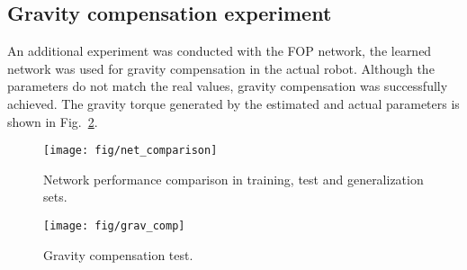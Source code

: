 \subsection{Gravity compensation experiment}
An additional experiment was conducted with the FOP network, the learned network was used for gravity compensation in the actual robot. Although the parameters do not match the real values, gravity compensation was successfully achieved. The gravity torque generated by the estimated and actual parameters is shown in Fig.~\ref{fig:grav_comp}.
\begin{figure}[h]
\begin{center}
    \texttt{[image: fig/net\_comparison]} 
    \caption{Network performance comparison in training, test and generalization sets.}
    \label{fig:net_comparison}
\end{center}
\end{figure}
\begin{figure}[h]
\begin{center}
    \texttt{[image: fig/grav\_comp]}
    \caption{Gravity compensation test.}
    \label{fig:grav_comp}
\end{center}
\end{figure}
